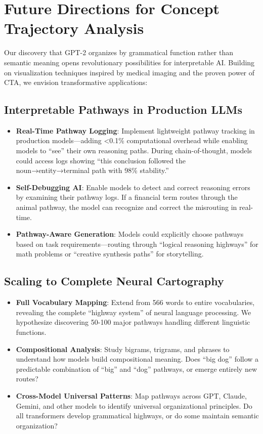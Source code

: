 \section{Future Directions for Concept Trajectory Analysis}

Our discovery that GPT-2 organizes by grammatical function rather than semantic meaning opens revolutionary possibilities for interpretable AI. Building on visualization techniques inspired by medical imaging and the proven power of CTA, we envision transformative applications:

\subsection{Interpretable Pathways in Production LLMs}

\begin{itemize}
    \item \textbf{Real-Time Pathway Logging}: Implement lightweight pathway tracking in production models—adding <0.1\% computational overhead while enabling models to ``see'' their own reasoning paths. During chain-of-thought, models could access logs showing ``this conclusion followed the noun→entity→terminal path with 98\% stability.''
    
    \item \textbf{Self-Debugging AI}: Enable models to detect and correct reasoning errors by examining their pathway logs. If a financial term routes through the animal pathway, the model can recognize and correct the misrouting in real-time.
    
    \item \textbf{Pathway-Aware Generation}: Models could explicitly choose pathways based on task requirements—routing through ``logical reasoning highways'' for math problems or ``creative synthesis paths'' for storytelling.
\end{itemize}

\subsection{Scaling to Complete Neural Cartography}

\begin{itemize}
    \item \textbf{Full Vocabulary Mapping}: Extend from 566 words to entire vocabularies, revealing the complete ``highway system'' of neural language processing. We hypothesize discovering 50-100 major pathways handling different linguistic functions.
    
    \item \textbf{Compositional Analysis}: Study bigrams, trigrams, and phrases to understand how models build compositional meaning. Does ``big dog'' follow a predictable combination of ``big'' and ``dog'' pathways, or emerge entirely new routes?
    
    \item \textbf{Cross-Model Universal Patterns}: Map pathways across GPT, Claude, Gemini, and other models to identify universal organizational principles. Do all transformers develop grammatical highways, or do some maintain semantic organization?
\end{itemize}

